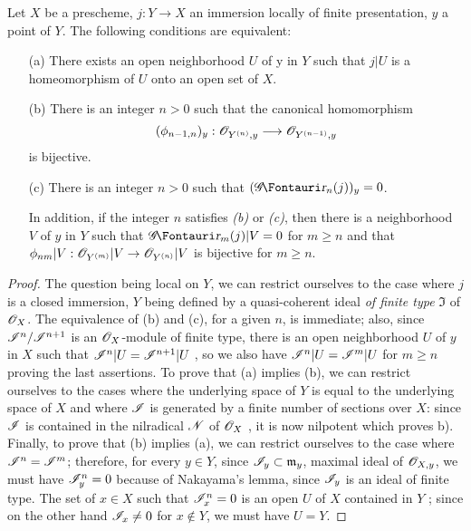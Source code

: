 \begin{proposition}[16.1.9]
\label{IV.16.1.9}
Let $X$ be a prescheme, $j: Y \to X$ an immersion locally of finite presentation, $y$ a point of $Y$. The following conditions are equivalent:
\begin{enumerate}
  \item[(a)] There exists an open neighborhood $U$ of y in $Y$ such that $j|U$ is a homeomorphism of $U$ onto an open set of $X$.
  \item[(b)] There is an integer $n>0$ such that the canonical homomorphism
  \[
    (\phi_{n-1,n})_y: \sh{O}_{Y^{(n)},y} \to \sh{O}_{Y^{(n-1)},y}
  \]
  is bijective.
  \item[(c)] There is an integer $n>0$ such that $(\shGr_n(j))_y = 0$.
  
  In addition, if the integer $n$ satisfies \emph{(b)} or \emph{(c)}, then there is a neighborhood $V$ of $y$ in $Y$ such that $\shGr_m(j)|V = 0$ for $m \geq n$ and that $\phi_{nm}|V: \sh{O}_{Y^{(m)}}|V \to \sh{O}_{Y^{(n)}}|V$ is bijective for $m \geq n$. 
\end{enumerate}
\end{proposition}

\begin{proof}
The question being local on $Y$, we can restrict ourselves to the case where $j$ is a closed immersion, $Y$ being defined by a quasi-coherent ideal \emph{of finite type} $\mathfrak{I}$ of $\mathscr{O}_X$.
The equivalence of (b) and (c), for a given $n$, is immediate;
also, since $\mathscr{I}^n/\mathscr{I}^{n+1}$ is an $\mathscr{O}_X$-module of finite type, there is an open neighborhood $U$ of $y$ in $X$ such that $\mathscr{I}^n|U = \mathscr{I}^{n+1}|U$ , so we also have $\mathscr{I}^n|U = \mathscr{I}^m|U$ for $m \geq n$ proving the last assertions.
To prove that (a) implies (b), we can restrict ourselves to the cases where the underlying space of $Y$ is equal to the underlying space of $X$ and where $\mathscr{I}$ is generated by a finite number of sections over $X$:
since $\mathscr{I}$ is contained in the nilradical $\mathscr{N}$ of $\mathscr{O}_X$ , it is now nilpotent which proves b).
Finally, to prove that (b) implies (a), we can restrict ourselves to the case where $\mathscr{I}^n = \mathscr{I}^m$; 
therefore, for every $y \in Y$, since $\mathscr{I}_y \subset \mathfrak{m}_y$, maximal ideal of $\mathscr{O}_{X,y}$, we must have $\mathscr{I}^n_y = 0$ because of Nakayama's lemma, since $\mathscr{I}_y$ is an ideal of finite type.
The set of $x \in X$ such that $\mathscr{I}^n_x = 0$ is an open $U$ of $X$ contained in $Y$ ;
since on the other hand $\mathscr{I}_x \neq 0$ for $x \notin Y$, we must have $U = Y$.
\end{proof}

